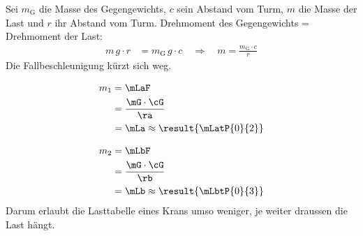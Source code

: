 Sei $m_\mathrm{G}$ die Masse des Gegengewichts, $c$ sein Abstand vom Turm, $m$ die Masse der Last und $r$ ihr Abstand vom Turm. Drehmoment des Gegengewichts = Drehmoment der Last:
\begin{align}
 m\,g\cdot r &= m_\mathrm{G}\,g\cdot c \quad\Rightarrow\quad m = \frac{m_\mathrm{G}\cdot c}{r}
\end{align}
Die Fallbeschleunigung kürzt sich weg.

\begin{abcliste}
\abc
\begin{align}
 m_1 &= \mLaF \\
   &= \frac{\mG\cdot\cG}{\ra} \\
   &= \mLa \approx \result{\mLatP{0}{2}}
\end{align}

\abc
\begin{align}
 m_2 &= \mLbF \\
   &= \frac{\mG\cdot\cG}{\rb} \\
   &= \mLb \approx \result{\mLbtP{0}{3}}
\end{align}
Darum erlaubt die Lasttabelle eines Krans umso weniger, je weiter draussen die Last hängt.
\end{abcliste}
